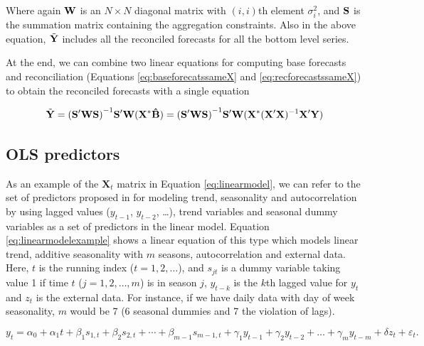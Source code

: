 \documentclass[11pt,a4paper,]{article}
\begin{document}
Where again \(\bf W\) is an \(N\times N\) diagonal matrix with
\((i,i)\)th element \(\sigma_i^2\), and \(\bf S\) is the summation
matrix containing the aggregation constraints. Also in the above
equation, \({\tilde{\bf Y}}\) includes all the reconciled forecasts for
all the bottom level series.

At the end, we can combine two linear equations for computing base
forecasts and reconciliation (Equations \eqref{eq:baseforecatssameX} and
\eqref{eq:recforecastssameX}) to obtain the reconciled forecasts with a
single equation

\begin{equation}\label{eq:singlestepsameX}
{\tilde{\bf Y}} = {(\bf S'WS)}^{-1}{\bf S'W} 
                        ({\bf X}^* {\bf \hat B}) 
                        = {(\bf S'WS)}^{-1}{\bf S'W} 
                        ({\bf X}^* ({\bf X' X})^{-1} {\bf X' Y})
\end{equation}

\subsection{OLS predictors}\label{ols-predictors}

As an example of the \(\bm{X}_t\) matrix in Equation
\eqref{eq:linearmodel}, we can refer to the set of predictors proposed in
\textcite{ashouri2018} for modeling trend, seasonality and
autocorrelation by using lagged values (\(y_{t-1}\), \(y_{t-2}\),
\dots), trend variables and seasonal dummy variables as a set of
predictors in the linear model. Equation \eqref{eq:linearmodelexample}
shows a linear equation of this type which models linear trend, additive
seasonality with \(m\) seasons, autocorrelation and external data. Here,
\(t\) is the running index (\(t=1,2,\dots\)), and \(s_{jt}\) is a dummy
variable taking value 1 if time \(t\) (\(j=1, 2, \dots, m\)) is in
season \(j\), \(y_{t-k}\) is the \(k\)th lagged value for \(y_t\) and
\(z_t\) is the external data. For instance, if we have daily data with
day of week seasonality, \(m\) would be 7 (6 seasonal dummies and 7 the
violation of lags).

\begin{equation}\label{eq:linearmodelexample}
    y_t = \alpha_0 + \alpha_1 t + \beta_1 s_{1,t} + \beta_2 s_{2,t} + \cdots + \beta_{m-1} s_{m-1,t} + \gamma_1 y_{t-1} + \gamma_2 y_{t-2} + \dots + \gamma_m y_{t-m} + \delta z_t + \varepsilon_t.
\end{equation}
\end{document}
